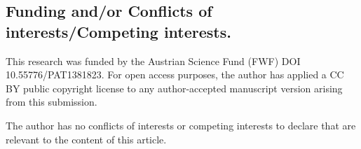\documentclass[10pt, reqno]{amsart}
\theoremstyle{plain}
\theoremstyle{definition}
\numberwithin{equation}{section}
\begin{document}
\subsection*{Funding and/or Conflicts of interests/Competing interests.}

This research was funded %
    by the Austrian Science Fund (FWF) DOI 10.55776/PAT1381823.
    For open access purposes, the author has applied a CC BY public copyright license 
    to any author-accepted manuscript version arising from this submission.

    The author has no conflicts of interests or competing interests to declare that are relevant to the content of this article.


    



%
%
\end{document}
